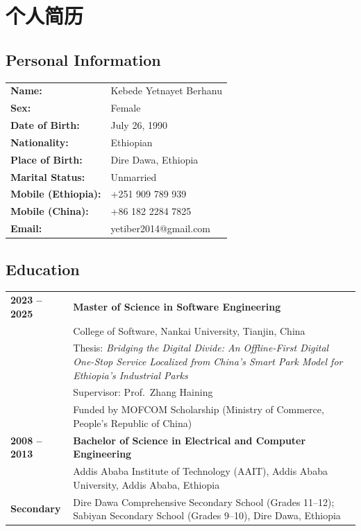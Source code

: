 \chapter*{个人简历}

\section*{Personal Information}

\begin{tabular}{@{} p{4cm} p{10cm}}
\textbf{Name:}            & Kebede Yetnayet Berhanu \\
\textbf{Sex:}             & Female \\
\textbf{Date of Birth:}   & July 26, 1990 \\
\textbf{Nationality:}     & Ethiopian \\
\textbf{Place of Birth:}  & Dire Dawa, Ethiopia \\
\textbf{Marital Status:}  & Unmarried \\
\textbf{Mobile (Ethiopia):} & +251 909 789 939 \\
\textbf{Mobile (China):}   & +86 182 2284 7825 \\
\textbf{Email:}            & yetiber2014@gmail.com \\
\end{tabular}

\section*{Education}

\begin{tabular}{@{} p{3.5cm} p{10cm}}
\textbf{2023 -- 2025} & \textbf{Master of Science in Software Engineering} \\
                       & College of Software, Nankai University, Tianjin, China \\
                       & Thesis: \textit{Bridging the Digital Divide: An Offline-First Digital One-Stop Service Localized from China's Smart Park Model for Ethiopia's Industrial Parks} \\
                       & Supervisor: Prof.\ Zhang Haining \\
                       & Funded by MOFCOM Scholarship (Ministry of Commerce, People's Republic of China) \\[0.5cm]
\textbf{2008 -- 2013} & \textbf{Bachelor of Science in Electrical and Computer Engineering} \\
                       & Addis Ababa Institute of Technology (AAIT), Addis Ababa University, Addis Ababa, Ethiopia \\[0.5cm]
\textbf{Secondary}    & Dire Dawa Comprehensive Secondary School (Grades 11--12); Sabiyan Secondary School (Grades 9--10), Dire Dawa, Ethiopia \\
\end{tabular}

